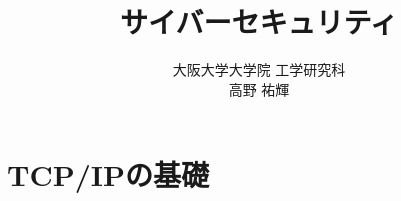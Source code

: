 \documentclass[fleqn]{jsarticle}
\title{サイバーセキュリティ}
\author{
  大阪大学大学院 工学研究科\\
  高野 祐輝
}
\begin{document}
\maketitle

\tableofcontents










\section{TCP/IPの基礎} \label{sec:tcpip}

\end{document}
